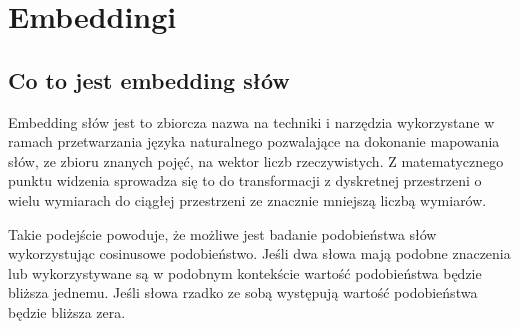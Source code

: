 \newpage %
\section{Embeddingi} \label{embeddings}

\subsection{Co to jest embedding słów}





Embedding słów jest to zbiorcza nazwa na techniki i narzędzia wykorzystane w ramach przetwarzania języka naturalnego pozwalające na dokonanie mapowania słów, ze zbioru znanych pojęć, na wektor liczb rzeczywistych. Z matematycznego punktu widzenia sprowadza się to do transformacji z dyskretnej przestrzeni o wielu wymiarach do ciągłej przestrzeni ze znacznie mniejszą liczbą wymiarów. 



Takie podejście powoduje, że możliwe jest badanie podobieństwa słów wykorzystując cosinusowe podobieństwo. Jeśli dwa słowa mają podobne znaczenia lub wykorzystywane są w podobnym kontekście  wartość podobieństwa będzie bliższa jednemu. Jeśli słowa rzadko ze sobą występują wartość podobieństwa będzie bliższa zera. 








